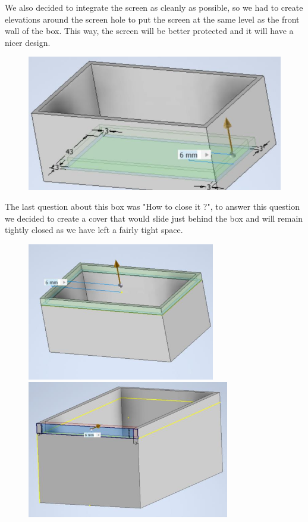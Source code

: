 We also decided to integrate the screen as cleanly as possible, so we had to create elevations around the screen hole to put the screen at the same level as the front wall of the box. This way, the screen will be better protected and it will have a nicer design.
\begin{figure}[H]
    \centering
    \includegraphics[width=.7\textwidth]{images/casing/img22.jpg}
\end{figure}

The last question about this box was "How to close it ?", to answer this question we decided to create a cover that would slide just behind the box and will remain tightly closed as we have left a fairly tight space.
\begin{figure}[H]
    \includegraphics[height=6cm]{images/casing/img23.jpg}
    \hfill
    \includegraphics[height=6cm]{images/casing/img24.jpg}
\end{figure}

